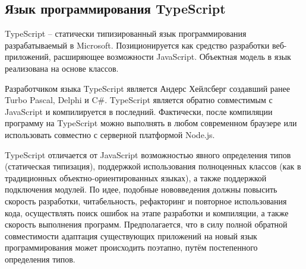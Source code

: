 \subsection{Язык программирования TypeScript}

TypeScript -- статически типизированный язык программирования разрабатываемый в Microsoft. Позиционируется как средство разработки веб-приложений, расширяющее возможности JavaScript. Объектная модель в язык реализована на основе классов.

Разработчиком языка TypeScript является Андерс Хейлсберг создавший ранее Turbo Pascal, Delphi и C\#.
TypeScript является обратно совместимым с JavaScript и компилируется в последний. Фактически, после компиляции программу на TypeScript можно выполнять в любом современном браузере или использовать совместно с серверной платформой Node.js.

TypeScript отличается от JavaScript возможностью явного определения типов (статическая типизация), поддержкой использования полноценных классов (как в традиционных объектно-ориентированных языках), а также поддержкой подключения модулей. По идее, подобные нововведения должны повысить скорость разработки, читабельность, рефакторинг и повторное использования кода, осуществлять поиск ошибок на этапе разработки и компиляции, а также скорость выполнения программ.
Предполагается, что в силу полной обратной совместимости адаптация существующих приложений на новый язык программирования может происходить поэтапно, путём постепенного определения типов. \cite{wiki:TypeScript, TypeScript}